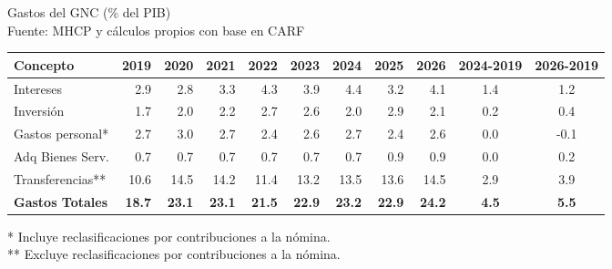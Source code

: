 \begin{frame}{Gastos del GNC (\% del PIB) \\ \small{Fuente: MHCP y cálculos propios con base en CARF}}
\footnotesize
\centering
\setlength{\tabcolsep}{4pt}
\begin{tabular}{l|rrrrrrrr|c|c}
\hline
\textbf{Concepto} & \textbf{2019} & \textbf{2020} & \textbf{2021} & \textbf{2022} & \textbf{2023} & \textbf{2024} & \textbf{2025} & \textbf{2026} & \textbf{\tiny{2024-2019}} & \textbf{\tiny{2026-2019}} \\
\hline
Intereses                   &  2.9 &  2.8 &  3.3 &  4.3 &  3.9 &  4.4 &  3.2 &  4.1 & 1.4 & 1.2 \\
Inversi\'on                 &  1.7 &  2.0 &  2.2 &  2.7 &  2.6 &  2.0 &  2.9 &  2.1 & 0.2 & 0.4 \\
Gastos personal*         &  2.7 &  3.0 &  2.7 &  2.4 &  2.6 &  2.7 &  2.4 &  2.6 & 0.0 & -0.1 \\
Adq Bienes Serv.    &  0.7 &  0.7 &  0.7 &  0.7 &  0.7 &  0.7 &  0.9 &  0.9 & 0.0 & 0.2 \\
Transferencias**            & 10.6 & 14.5 & 14.2 & 11.4 & 13.2 & 13.5 & 13.6 & 14.5 & 2.9 & 3.9 \\
\textbf{Gastos Totales}              & \textbf{18.7} & \textbf{23.1} & \textbf{23.1} & \textbf{21.5} & \textbf{22.9} & \textbf{23.2} & \textbf{22.9} & \textbf{24.2} & \textbf{4.5} & \textbf{5.5} \\
\hline
\end{tabular}

\vspace{2mm}
\begin{flushleft}\footnotesize
* Incluye reclasificaciones por contribuciones a la n\'omina.\\
** Excluye reclasificaciones por contribuciones a la n\'omina.
\end{flushleft}
\end{frame}
